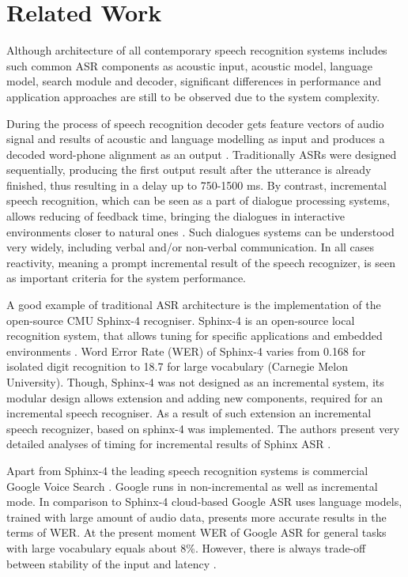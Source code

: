 \chapter {Related Work}
\label{ch:relatedWork}
Although architecture of  all contemporary speech recognition systems includes
such common ASR components as acoustic input, acoustic model, language model,
search module and decoder, significant differences in performance and 
application approaches are still to be observed due to the system complexity. 


During the process of speech recognition decoder gets feature vectors of audio
signal and results of acoustic and language modelling as input and produces
a decoded word-phone alignment as an output \parencite {jurafskymartin2009}.
Traditionally ASRs were designed sequentially, producing the first output result
after the utterance is already finished, thus resulting in a delay up to
750-1500 ms. By contrast, incremental speech recognition, which can be
seen as a part of dialogue processing systems, allows reducing of feedback time,
bringing the dialogues in interactive
environments closer to natural ones \parencite {skantzeschlangen2009}. 
Such dialogues systems can be understood very widely, including verbal and/or
non-verbal communication. In all cases reactivity, meaning a prompt
incremental result of the speech recognizer, is seen as important criteria for
the system performance. 

A good example of  traditional ASR architecture is the implementation of the
open-source CMU Sphinx-4 recogniser. Sphinx-4 is an open-source local
recognition system, that allows tuning for specific applications and embedded
environments \parencite
{Lamereetal2013:Eurospeech}.  Word Error Rate (WER) of Sphinx-4 varies from 0.168 for isolated
digit recognition to 18.7 for large vocabulary (Carnegie Melon University).
Though, Sphinx-4 was not designed as an incremental system, its modular design allows extension and adding new components, required 
for an incremental speech recogniser. As a result of such extension an
incremental speech recognizer, based on sphinx-4 was implemented. The authors present very detailed analyses of timing for
incremental results of Sphinx ASR \parencite {baumannetal2009:naacl}.

Apart from Sphinx-4 the leading speech recognition systems is commercial
Google Voice Search \parencite{schalkwyk2010}. Google runs in non-incremental as
well as incremental mode. In comparison to Sphinx-4  cloud-based Google ASR uses
language models, trained with  large amount of audio data, presents more
accurate results in the terms of WER. At the present moment WER of Google ASR for general tasks
with large vocabulary equals about 8\%. However, there is always trade-off
between stability of the input and latency \parencite {mcgrawgrauenstein2012}.

